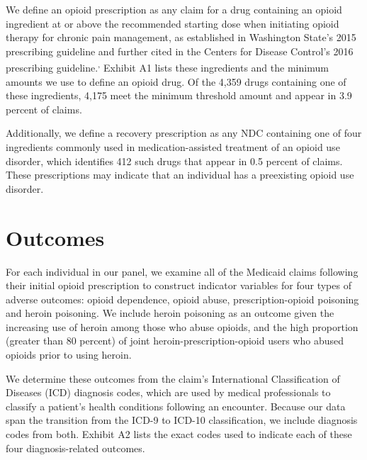 \documentclass[11pt, letter]{article}
\begin{document}
We define an opioid prescription as any claim for a drug containing an opioid ingredient at or above the recommended starting dose when initiating opioid therapy for chronic pain management, as established in Washington State's 2015 prescribing guideline and further cited in the Centers for Disease Control's 2016 prescribing guideline.\textsuperscript{,} Exhibit A1 lists these ingredients and the minimum amounts we use to define an opioid drug. Of the 4,359 drugs containing one of these ingredients, 4,175 meet the minimum threshold amount and appear in 3.9 percent of claims.

Additionally, we define a recovery prescription as any NDC containing one of four ingredients commonly used in medication-assisted treatment of an opioid use disorder, which identifies 412 such drugs that appear in 0.5 percent of claims. These prescriptions may indicate that an individual has a preexisting opioid use disorder.

\section{Outcomes}

For each individual in our panel, we examine all of the Medicaid claims following their initial opioid prescription to construct indicator variables for four types of adverse outcomes: opioid dependence, opioid abuse, prescription-opioid poisoning and heroin poisoning. We include heroin poisoning as an outcome given the increasing use of heroin among those who abuse opioids, and the high proportion (greater than 80 percent) of joint heroin-prescription-opioid users who abused opioids prior to using heroin.

We determine these outcomes from the claim's International Classification of Diseases (ICD) diagnosis codes, which are used by medical professionals to classify a patient's health conditions following an encounter. Because our data span the transition from the ICD-9 to ICD-10 classification, we include diagnosis codes from both. Exhibit A2 lists the exact codes used to indicate each of these four diagnosis-related outcomes. 
\end{document}
